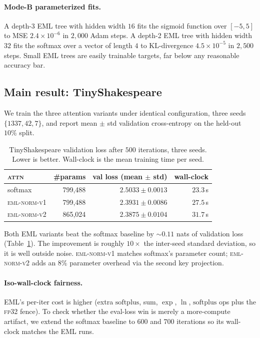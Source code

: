 \documentclass{article}
\begin{document}
\paragraph{Mode-B parameterized fits.} A depth-3 EML tree with hidden
width $16$ fits the sigmoid function over $[-5, 5]$ to MSE
$2.4\!\times\!10^{-6}$ in $2{,}000$ Adam steps. A depth-2 EML tree with
hidden width $32$ fits the softmax over a vector of length $4$ to
KL-divergence $4.5\!\times\!10^{-5}$ in $2{,}500$ steps. Small EML trees
are easily trainable targets, far below any reasonable accuracy bar.

\subsection{Main result: TinyShakespeare}

We train the three attention variants under identical configuration, three
seeds $\{1337, 42, 7\}$, and report mean $\pm$ std validation cross-entropy
on the held-out $10\%$ split.

\begin{table}[t]
\centering
\caption{TinyShakespeare validation loss after $500$ iterations, three
seeds. Lower is better. Wall-clock is the mean training time per seed.}
\label{tab:isoiter}
\begin{tabular}{lrrr}
\toprule
\textsc{attn} & \#params & val loss (mean $\pm$ std) & wall-clock \\
\midrule
softmax              &   799{,}488 & $2.5033 \pm 0.0013$ & $23.3$\,s \\
\textsc{eml-norm-v1} &   799{,}488 & $\mathbf{2.3931 \pm 0.0086}$ & $27.5$\,s \\
\textsc{eml-norm-v2} &   865{,}024 & $\mathbf{2.3875 \pm 0.0104}$ & $31.7$\,s \\
\bottomrule
\end{tabular}
\end{table}

Both EML variants beat the softmax baseline by $\sim$$0.11$ nats of
validation loss (Table~\ref{tab:isoiter}). The improvement is roughly
$10\times$ the inter-seed standard deviation, so it is well outside noise.
\textsc{eml-norm-v1} matches softmax's parameter count; \textsc{eml-norm-v2}
adds an $8\%$ parameter overhead via the second key projection.

\paragraph{Iso-wall-clock fairness.} EML's per-iter cost is higher
(extra $\mathrm{softplus}$, sum, $\exp$, $\ln$, $\mathrm{softplus}$ ops
plus the \textsc{fp32} fence). To check whether the eval-loss win is
merely a more-compute artifact, we extend the softmax baseline to $600$
and $700$ iterations so its wall-clock matches the EML runs.
\end{document}
